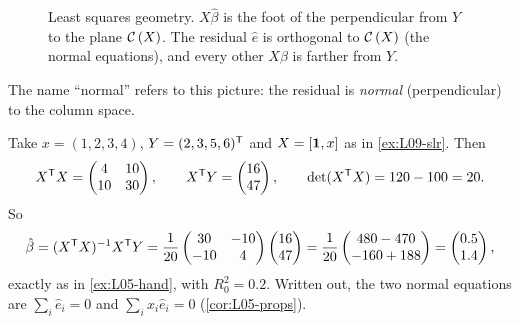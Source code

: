 \begin{figure}[ht]
\centering
{}
\caption{Least squares geometry. $X\hat\beta$ is the foot of the perpendicular from $Y$ to the plane $\mathcal{C}\left(X\right)$. The residual $\hat e$ is orthogonal to $\mathcal{C}\left(X\right)$ (the normal equations), and every other $X\beta$ is farther from $Y$.}
\label{fig:L12-geometry}
\end{figure}

The name ``normal'' refers to this picture: the residual is \emph{normal} (perpendicular) to the
column space.

\begin{example}\label{ex:L12-slr}
Take $x=(1,2,3,4)$, $Y=(2,3,5,6)^{\mathsf T}$ and $X=[\mathbf 1,x]$ as in \cref{ex:L09-slr}. Then
\[
X^{\mathsf T} X=\begin{pmatrix}4&10\\10&30\end{pmatrix},\qquad X^{\mathsf T} Y=\begin{pmatrix}16\\47\end{pmatrix},\qquad
\det(X^{\mathsf T} X)=120-100=20 .
\]
So
\[
\hat\beta=(X^{\mathsf T} X)^{-1}X^{\mathsf T} Y=\frac1{20}\begin{pmatrix}30&-10\\-10&4\end{pmatrix}\begin{pmatrix}16\\47\end{pmatrix}
=\frac1{20}\begin{pmatrix}480-470\\-160+188\end{pmatrix}=\begin{pmatrix}0.5\\1.4\end{pmatrix},
\]
exactly as in \cref{ex:L05-hand}, with $R_0^2=0.2$. Written out, the two normal equations
are $\sum_i\hat e_i=0$ and $\sum_ix_i\hat e_i=0$ (\cref{cor:L05-props}).
\end{example}

